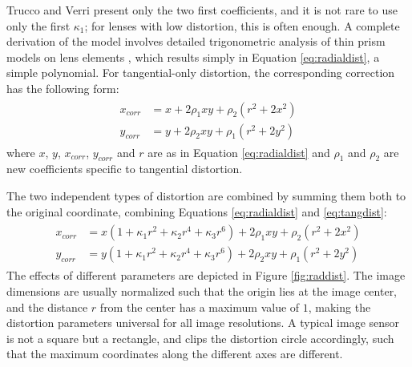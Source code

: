 Trucco and Verri \cite{trucco1998introductory} present only the two first coefficients, and it is not rare to use only the first $\kappa_1$; for lenses with low distortion, this is often enough.
A complete derivation of the model involves detailed trigonometric analysis of thin prism models on lens elements \cite{brown1966decentering,brown1971close}, which results simply in Equation \ref{eq:radialdist}, a simple polynomial.
For tangential-only distortion, the corresponding correction has the following form:
\begin{align} \label{eq:tangdist} \begin{split}
x_{corr} &= x + 2 \rho_1 x y + \rho_2 (r^2 + 2 x^2)\\
y_{corr} &= y + 2 \rho_2 x y + \rho_1 (r^2 + 2 y^2)
\end{split} \end{align}
where $x$, $y$, $x_{corr}$, $y_{corr}$ and $r$ are as in Equation \ref{eq:radialdist} and $\rho_1$ and $\rho_2$ are new coefficients specific to tangential distortion.

The two independent types of distortion are combined by summing them both to the original coordinate, combining Equations \ref{eq:radialdist} and \ref{eq:tangdist}:
\begin{align} \label{eq:bothdist} \begin{split}
	x_{corr} &= x (1 + \kappa_1 r^2 + \kappa_2 r^4 + \kappa_3 r^6) + 2 \rho_1 x y + \rho_2 (r^2 + 2 x^2)\\
	y_{corr} &= y (1 + \kappa_1 r^2 + \kappa_2 r^4 + \kappa_3 r^6) + 2 \rho_2 x y + \rho_1 (r^2 + 2 y^2)
\end{split} \end{align}
The effects of different parameters are depicted in Figure \ref{fig:raddist}.
The image dimensions are usually normalized such that the origin lies at the image center, and the distance $r$ from the center has a maximum value of $1$, making the distortion parameters universal for all image resolutions.
A typical image sensor is not a square but a rectangle, and clips the distortion circle accordingly, such that the maximum coordinates along the different axes are different.


